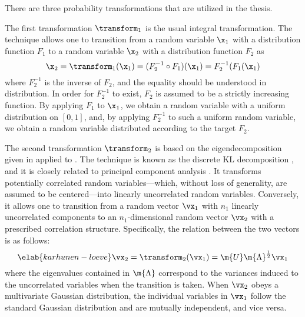 There are three probability transformations that are utilized in the thesis.

The first transformation $\transform_1$ is the usual integral transformation.
The technique allows one to transition from a random variable $\x_1$ with a
distribution function $F_1$ to a random variable $\x_2$ with a distribution
function $F_2$ as
\[
  \x_2 = \transform_1(\x_1) = (F_2^{-1} \circ F_1)(\x_1) = F_2^{-1}(F_1(\x_1)
\]
where $F_2^{-1}$ is the inverse of $F_2$, and the equality should be understood
in distribution. In order for $F_2^{-1}$ to exist, $F_2$ is assumed to be a
strictly increasing function. By applying $F_1$ to $\x_1$, we obtain a random
variable with a uniform distribution on $[0, 1]$, and, by applying $F_2^{-1}$ to
such a uniform random variable, we obtain a random variable distributed
according to the target $F_2$.

The second transformation $\transform_2$ is based on the eigendecomposition
given in  applied to . The
technique is known as the discrete \ac{KL} decomposition \cite{ghanem1991,
xiu2010}, and it is closely related to principal component analysis
\cite{hastie2013}. It transforms potentially correlated random
variables---which, without loss of generality, are assumed to be centered---into
linearly uncorrelated random variables. Conversely, it allows one to transition
from a random vector $\vx_1$ with $n_1$ linearly uncorrelated components to an
$n_1$-dimensional random vector $\vx_2$ with a prescribed correlation structure.
Specifically, the relation between the two vectors is as follows:
\begin{equation} \elab{karhunen-loeve}
  \vx_2 = \transform_2(\vx_1) = \m{U} \m{\Lambda}^\frac{1}{2} \vx_1
\end{equation}
where the eigenvalues contained in $\m{\Lambda}$ correspond to the variances
induced to the uncorrelated variables when the transition is taken. When $\vx_2$
obeys a multivariate Gaussian distribution, the individual variables in $\vx_1$
follow the standard Gaussian distribution and are mutually independent, and vice
versa.

